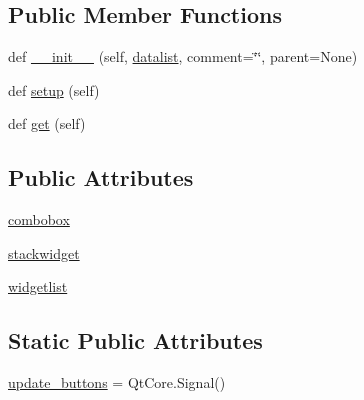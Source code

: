 \subsection*{Public Member Functions}
\begin{DoxyCompactItemize}
\item 
def \hyperlink{classmatplotlib_1_1backends_1_1qt__editor_1_1__formlayout_1_1FormComboWidget_a21a7ed4309acbca70083baf32a13cd1f}{\+\_\+\+\_\+init\+\_\+\+\_\+} (self, \hyperlink{namespacematplotlib_1_1backends_1_1qt__editor_1_1__formlayout_aa6cc072f6786851cbe265173ecb84a93}{datalist}, comment=\char`\"{}\char`\"{}, parent=None)
\item 
def \hyperlink{classmatplotlib_1_1backends_1_1qt__editor_1_1__formlayout_1_1FormComboWidget_a6b4046a3922ef2b89532c6e4b369a6ab}{setup} (self)
\item 
def \hyperlink{classmatplotlib_1_1backends_1_1qt__editor_1_1__formlayout_1_1FormComboWidget_a25cd7de3209e23f304467afe59dfa484}{get} (self)
\end{DoxyCompactItemize}
\subsection*{Public Attributes}
\begin{DoxyCompactItemize}
\item 
\hyperlink{classmatplotlib_1_1backends_1_1qt__editor_1_1__formlayout_1_1FormComboWidget_a080bebc2b97124ccfcf1715b4385e061}{combobox}
\item 
\hyperlink{classmatplotlib_1_1backends_1_1qt__editor_1_1__formlayout_1_1FormComboWidget_a35eac53f707246e0f7e2cfcf5d0559ba}{stackwidget}
\item 
\hyperlink{classmatplotlib_1_1backends_1_1qt__editor_1_1__formlayout_1_1FormComboWidget_a03935c08e1bf8d0811dd4e219259670c}{widgetlist}
\end{DoxyCompactItemize}
\subsection*{Static Public Attributes}
\begin{DoxyCompactItemize}
\item 
\hyperlink{classmatplotlib_1_1backends_1_1qt__editor_1_1__formlayout_1_1FormComboWidget_aef3ef3fefd24558bc500b33b7dbcec9e}{update\+\_\+buttons} = Qt\+Core.\+Signal()
\end{DoxyCompactItemize}


